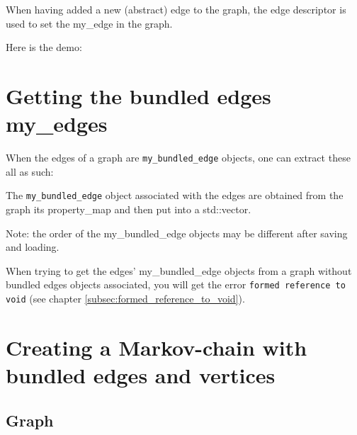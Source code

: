 

When having added a new (abstract) edge to the graph, the edge descriptor
is used to set the my_edge in the graph.

Here is the demo:



\section{Getting the bundled edges my\_edges}
\label{subsec:get_bundled_edge_my_edges}

When the edges of a graph are \verb;my_bundled_edge; objects, 
one can extract these all as such:



The \verb;my_bundled_edge; object associated with the edges are obtained from
the graph its property_map and then put into a std::vector.

Note: the order of the my\_bundled\_edge objects may be different after saving
and loading.

When trying to get the edges' my\_bundled\_edge objects from a graph without
bundled edges objects associated, you will get the error 
\verb;formed reference to void; (see chapter \ref{subsec:formed_reference_to_void}).

\section{Creating a Markov-chain with bundled edges and vertices}
\label{subsec:create_bundled_edges_and_vertices_markov_chain}

\subsection{Graph}

